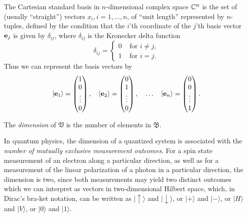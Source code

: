 The Cartesian standard basis in $n$-dimensional complex space ${\Bbb C}^n$
is the set of (usually ``straight'')
vectors $x_i, i=1, \ldots , n$, of ``unit length''
represented by $n$-tuples,
defined by the condition that the $i$'th coordinate of the $j$'th basis vector
${\bf e}_j$ is given by $\delta_{ij}$, where $\delta_{ij}$ is the Kronecker delta function
\begin{equation}
\delta_{ij} =\begin{cases}
0  &\text{ for }i\neq j , \\
1  &\text{ for }i = j.
\end{cases}
\end{equation}
Thus we can represent the basis vectors by
\begin{equation}
\begin{split}
\vert {\bf e}_1 \rangle = \begin{pmatrix}1\\ 0\\ \vdots\\ 0\end{pmatrix},\quad
\vert {\bf e}_2 \rangle = \begin{pmatrix}0\\ 1\\ \vdots\\ 0\end{pmatrix},\quad
\ldots\quad
\vert {\bf e}_n \rangle = \begin{pmatrix}0\\ 0\\ \vdots\\ 1\end{pmatrix}.
\end{split}
\label{2016-m-fdvs-csb}
\end{equation}





The {\em dimension}
of $\mathfrak V$ is the number of elements in $\mathfrak B$.

In quantum physics, the dimension of a quantized system is associated with
the {\em number of mutually exclusive measurement outcomes}.
For a spin state measurement of an electron
along a particular direction,
as well as for a measurement of the linear polarization
of a photon in a particular direction,
the dimension is two, since both measurements
may yield two distinct outcomes
which we can
interpret as vectors in two-dimensional Hilbert space,
which, in Dirac's bra-ket notation, can be written as
$
\vert \uparrow \rangle$ and $\vert \downarrow \rangle$,
or $\vert + \rangle$ and $
\vert - \rangle
$,
or
$
\vert H \rangle $ and $
\vert V \rangle
$,
or
$
\vert 0 \rangle $ and $
\vert 1 \rangle
$.




